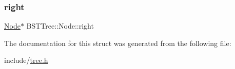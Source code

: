 \mbox{\label{struct_b_s_t_tree_1_1_node_a51a49dec2ada0ba140f9df5aa48119a8}} 
\subsubsection{\texorpdfstring{right}{right}}
{\footnotesize\ttfamily \mbox{\hyperlink{struct_b_s_t_tree_1_1_node}{Node}}$\ast$ B\+S\+T\+Tree\+::\+Node\+::right}



The documentation for this struct was generated from the following file\+:\begin{DoxyCompactItemize}
\item 
include/\mbox{\hyperlink{tree_8h}{tree.\+h}}\end{DoxyCompactItemize}
